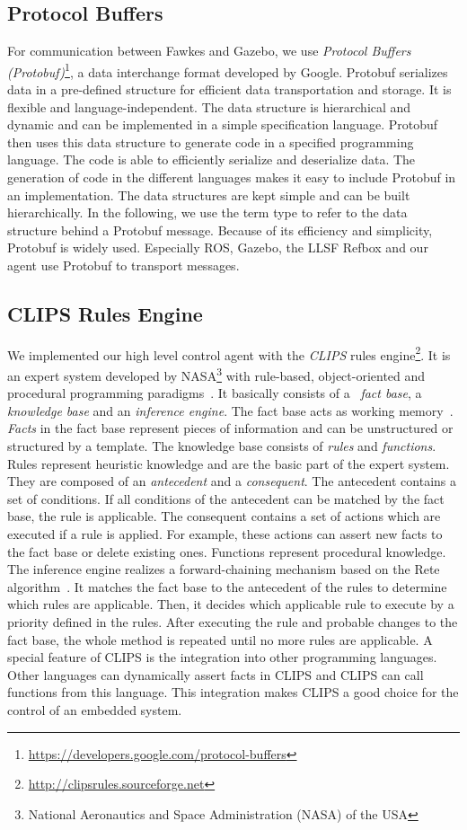 \subsection{Protocol Buffers}
For communication between Fawkes and Gazebo, we use \textit{Protocol Buffers (Protobuf)}\footnote{\url{https://developers.google.com/protocol-buffers}}, a data interchange format developed by Google. Protobuf serializes data in a pre-defined structure for efficient data transportation and storage. It is flexible and language-independent. The data structure is hierarchical and dynamic and can be implemented in a simple specification language. Protobuf then uses this data structure to generate code in a specified programming language. The code is able to efficiently serialize and deserialize data. The generation of code in the different languages makes it easy to include Protobuf in an implementation. The data structures are kept simple and can be built hierarchically. In the following, we use the term type to refer to the data structure behind a Protobuf message. Because of its efficiency and simplicity, Protobuf is widely used. Especially ROS, Gazebo, the LLSF Refbox and our agent use Protobuf to transport messages.

\subsection{CLIPS Rules Engine}
We implemented our high level control agent with the \textit{CLIPS} rules engine\footnote{\url{http://clipsrules.sourceforge.net}}. It is an expert system developed by NASA\footnote{National Aeronautics and Space Administration (NASA) of the USA} with rule-based, object-oriented and procedural programming paradigms~\cite{Clips,clips_manual}. It basically consists of a ~\textit{fact base}, a \textit{knowledge base} and an \textit{inference engine}. The fact base acts as working memory~\cite{Incremental}. \textit{Facts} in the fact base represent pieces of information and can be unstructured or structured by a template. The knowledge base consists of \textit{rules} and \textit{functions}. Rules represent heuristic knowledge and are the basic part of the expert system. They are composed of an \textit{antecedent} and a \textit{consequent}. The antecedent contains a set of conditions. If all conditions of the antecedent can be matched by the fact base, the rule is applicable. The consequent contains a set of actions which are executed if a rule is applied. For example, these actions can assert new facts to the fact base or delete existing ones. Functions represent procedural knowledge. The inference engine realizes a forward-chaining mechanism based on the Rete algorithm~\cite{rete}. It matches the fact base to the antecedent of the rules to determine which rules are applicable. Then, it decides which applicable rule to execute by a priority defined in the rules. After executing the rule and probable changes to the fact base, the whole method is repeated until no more rules are applicable. A special feature of CLIPS is the integration into other programming languages. Other languages can dynamically assert facts in CLIPS and CLIPS can call functions from this language. This integration makes CLIPS a good choice for the control of an embedded system.

